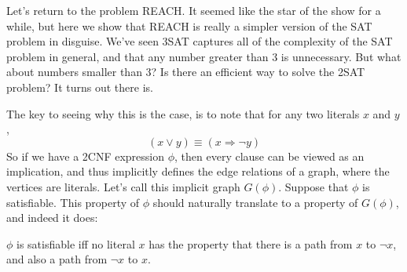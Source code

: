 Let's return to the problem REACH. It seemed like the star of the show for a while, but here we show that REACH is really a simpler version of the SAT problem in disguise. We've seen 3SAT captures all of the complexity of the SAT problem in general, and that any number greater than 3 is unnecessary. But what about numbers smaller than 3? Is there an efficient way to solve the 2SAT problem? It turns out there is.
\par The key to seeing why this is the case, is to note that for any two literals $x$ and $y$,
\[ (x \vee y) \equiv (x \Rightarrow \neg y)\]
So if we have a 2CNF expression $\phi$, then every clause can be viewed as an implication, and thus implicitly defines the edge relations of a graph, where the vertices are literals. Let's call this implicit graph $G(\phi)$. Suppose that $\phi$ is satisfiable. This property of $\phi$ should naturally translate to a property of $G(\phi)$, and indeed it does:
\begin{theorem}
    $\phi$ is satisfiable iff no literal $x$ has the property that there is a path from $x$ to $\neg x$, and also a path from $\neg x$ to $x$. 
\end{theorem}
